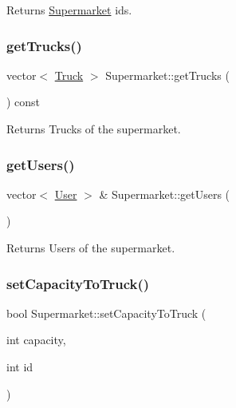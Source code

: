 \begin{DoxyReturn}{Returns}
\hyperlink{class_supermarket}{Supermarket} ids. 
\end{DoxyReturn}
\mbox{\label{class_supermarket_a7f7bb99593c521362fd5df23368beb94}} 
\subsubsection{\texorpdfstring{get\+Trucks()}{getTrucks()}}
{\footnotesize\ttfamily vector$<$ \hyperlink{class_truck}{Truck} $>$ Supermarket\+::get\+Trucks (\begin{DoxyParamCaption}{ }\end{DoxyParamCaption}) const}

\begin{DoxyReturn}{Returns}
Trucks of the supermarket. 
\end{DoxyReturn}
\mbox{\label{class_supermarket_afd4a6608933bbdb0937fd69804cfe5ff}} 
\subsubsection{\texorpdfstring{get\+Users()}{getUsers()}}
{\footnotesize\ttfamily vector$<$ \hyperlink{class_user}{User} $>$ \& Supermarket\+::get\+Users (\begin{DoxyParamCaption}{ }\end{DoxyParamCaption})}

\begin{DoxyReturn}{Returns}
Users of the supermarket. 
\end{DoxyReturn}
\mbox{\label{class_supermarket_aa18f0ce05a8ce75b4ef2da141edb18d2}} 
\subsubsection{\texorpdfstring{set\+Capacity\+To\+Truck()}{setCapacityToTruck()}}
{\footnotesize\ttfamily bool Supermarket\+::set\+Capacity\+To\+Truck (\begin{DoxyParamCaption}\item[{int}]{capacity,  }\item[{int}]{id }\end{DoxyParamCaption})}



